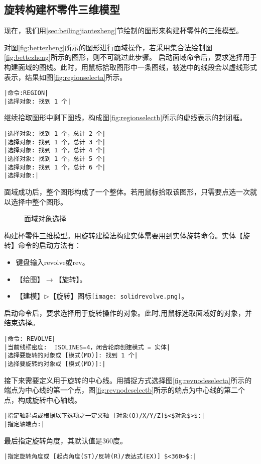 \subsection{旋转构建杯零件三维模型}
现在，我们用\ref{sec:beilingjiantezheng}节绘制的图形来构建杯零件的三维模型。
\begin{procedure}
\item 对图\ref{fig:bettezheng}所示的图形进行面域操作，若采用集合法绘制图\ref{fig:bettezheng}所示的图形，则不可跳过此步骤。
启动面域命令后，要求选择用于构建面域的图线。此时，用鼠标拾取图形中一条图线，被选中的线段会以虚线形式表示，结果如图\ref{fig:regionselecta}所示。
\begin{lstlisting}
|命令:REGION|
|选择对象: 找到 1 个|
\end{lstlisting}
继续拾取图形中剩下图线，构成图\ref{fig:regionselectb}所示的虚线表示的封闭框。
\begin{lstlisting}
|选择对象: 找到 1 个，总计 2 个|
|选择对象: 找到 1 个，总计 3 个|
|选择对象: 找到 1 个，总计 4 个|
|选择对象: 找到 1 个，总计 5 个|
|选择对象: 找到 1 个，总计 6 个|
|选择对象:|
\end{lstlisting}
面域成功后，整个图形构成了一个整体。若用鼠标拾取该图形，只需要点选一次就以选择中整个图形。
\begin{figure}[htbp]
\centering
{}\hspace{30pt}
\caption{面域对象选择}
\end{figure}
\item 构建杯零件三维模型。用旋转建模法构建实体需要用到实体旋转命令。实体【旋转】命令的启动方法有：
\begin{itemize}
\item 键盘输入revolve或rev。
\item 【绘图】$\rightarrow$【旋转】。
\item 【建模】$\triangleright$【旋转】图标\texttt{[image: solidrevolve.png]}。
\end{itemize}
启动命令后，要求选择用于旋转操作的对象。此时,用鼠标选取面域好的对象，并结束选择。
\begin{lstlisting}
|命令: REVOLVE|
|当前线框密度:  ISOLINES=4，闭合轮廓创建模式 = 实体|
|选择要旋转的对象或 [模式(MO)]: 找到 1 个|
|选择要旋转的对象或 [模式(MO)]:|
\end{lstlisting}
接下来需要定义用于旋转的中心线。用捕捉方式选择图\ref{fig:revnodeselecta}所示的端点为中心线的第一个点，图\ref{fig:revnodeselectb}所示的端点为中心线的第二个点，构成旋转中心轴线。
\begin{lstlisting}
|指定轴起点或根据以下选项之一定义轴 [对象(O)/X/Y/Z]$<$对象$>$:|
|指定轴端点:|
\end{lstlisting}
最后指定旋转角度，其默认值是360度。
\begin{lstlisting}
|指定旋转角度或 [起点角度(ST)/反转(R)/表达式(EX)] $<360>$:|
\end{lstlisting}


\end{procedure}
